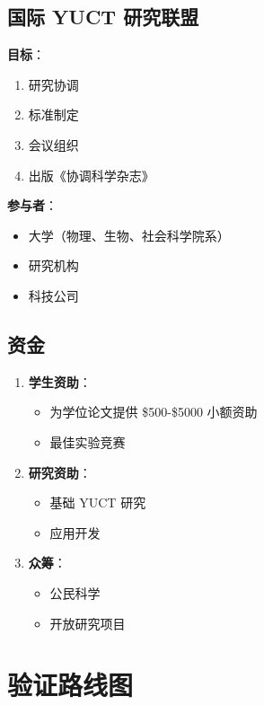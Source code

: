 \documentclass[12pt,a4paper]{article}
\begin{document}
	\subsection{国际 YUCT 研究联盟}
	
	\textbf{目标}：
	\begin{enumerate}
		\item 研究协调
		\item 标准制定
		\item 会议组织
		\item 出版《协调科学杂志》
	\end{enumerate}
	
	\textbf{参与者}：
	\begin{itemize}
		\item 大学（物理、生物、社会科学院系）
		\item 研究机构
		\item 科技公司
	\end{itemize}
	
	\subsection{资金}
	
	\begin{enumerate}
		\item \textbf{学生资助}：
		\begin{itemize}
			\item 为学位论文提供 \$500-\$5000 小额资助
			\item 最佳实验竞赛
		\end{itemize}
		
		\item \textbf{研究资助}：
		\begin{itemize}
			\item 基础 YUCT 研究
			\item 应用开发
		\end{itemize}
		
		\item \textbf{众筹}：
		\begin{itemize}
			\item 公民科学
			\item 开放研究项目
		\end{itemize}
	\end{enumerate}
	
	\section{验证路线图}
	
\end{document}
